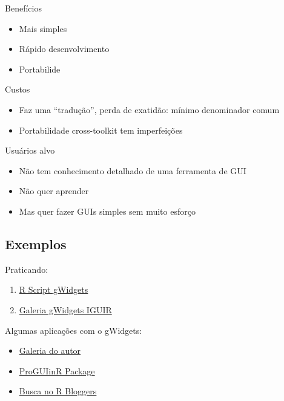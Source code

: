 \begin{frame}
  \begin{multicols}{2}
    
    \begin{block}{Benefícios}
      \begin{itemize}
      \item Mais simples
      \item Rápido desenvolvimento
      \item Portabilide
      \end{itemize}
    \end{block}
    \vfill
    \columnbreak
    \begin{block}{Custos}
      \begin{itemize}
      \item Faz uma ``tradução'', perda de exatidão: mínimo denominador
        comum
      \item Portabilidade cross-toolkit tem imperfeições
      \end{itemize}
    \end{block}
  \end{multicols}

  \begin{block}{Usuários alvo}
    \begin{itemize}
    \item Não tem conhecimento detalhado de uma ferramenta de GUI
    \item Não quer aprender
    \item Mas quer fazer GUIs simples sem muito esforço
    \end{itemize}
  \end{block}

\end{frame}


\subsection{Exemplos}

\begin{frame}
 Praticando:
  \begin{enumerate}
  \item
    \href{run:./R/gWidgets/gWidgets.R}{R Script gWidgets}
  \item 
    \href{run:gWidgets.html}{Galeria gWidgets IGUIR}
  \end{enumerate}

  \vspace{0.5cm}
  Algumas aplicações com o gWidgets:
  \begin{itemize}
  \item \href{http://cran.r-project.org/web/packages/gWidgets/vignettes/}{Galeria
      do autor}
  \item \href{https://github.com/jverzani/ProgGUIinR}{ProGUIinR Package}
  \item \href{http://www.r-bloggers.com/?s=gWidgets}{Busca no R
      Bloggers}
  \end{itemize}
\end{frame}

